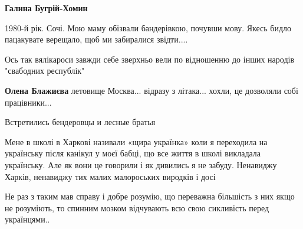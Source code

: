\begin{itemize}
\begin{itemize}
\textbf{Галина Бугрій-Хомин} 

1980-й рік. Сочі. Мою маму обізвали бандерівкою, почувши мову. Якесь бидло
пацакувате верещало, щоб ми забиралися звідти....

Ось так вялікароси завжди себе зверхньо вели по відношенню до інших народів
"свабодних республік"

\begin{itemize}
 
\textbf{Олена Блажиєва} летовище Москва... відразу з літака... хохли, це дозволяли собі працівники...
\end{itemize}

 
Встретились бендеровцы и лесные братья

\end{itemize}

 

Мене в школі в Харкові називали «щира українка» коли я переходила на українську
після канікул у моєї бабці, що все життя в школі викладала українську. Але як
вони це говорили і як дивились я не забуду. Ненавиджу Харків, ненавиджу тих
малих малороських виродків і досі

\begin{itemize}

 

Не раз з таким мав справу і добре розумію, що переважна більшість з них якщо не
розуміють, то спинним мозком відчувають всю свою сикливість перед українцями..


\end{itemize}
\end{itemize}
